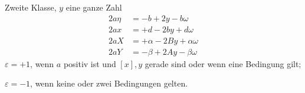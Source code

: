 Zweite Klasse, $y$ eine ganze Zahl
\[
\begin{aligned}
2a\eta&=-b+2y-b\omega\\
2ax&=+d-2by+d\omega\\
2aX&=+\alpha-2By+\alpha\omega\\
2aY&=-\beta+2Ay-\beta\omega
\end{aligned}
\]
\noindent $\varepsilon=+1$, wenn $a$ positiv ist und $[x],y$ gerade sind oder wenn eine Bedingung gilt;\par
\noindent $\varepsilon=-1$, wenn keine oder zwei Bedingungen gelten.
